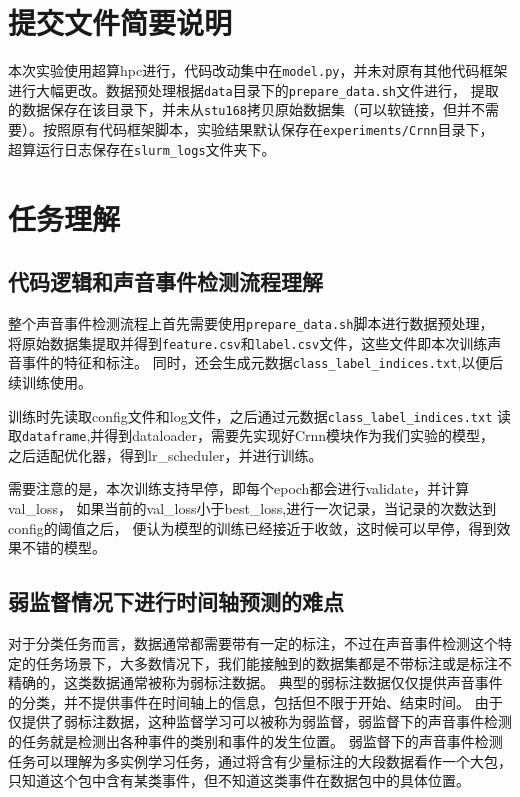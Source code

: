 \documentclass[]{ctexart}
\begin{document}
\section{提交文件简要说明}
本次实验使用超算hpc进行，代码改动集中在\texttt{model.py}，并未对原有其他代码框架进行大幅更改。数据预处理根据\texttt{data}目录下的\texttt{prepare\_data.sh}文件进行，
提取的数据保存在该目录下，并未从\texttt{stu168}拷贝原始数据集（可以软链接，但并不需要）。按照原有代码框架脚本，实验结果默认保存在\texttt{experiments/Crnn}目录下，
超算运行日志保存在\texttt{slurm\_logs}文件夹下。
\section{任务理解}

\subsection{代码逻辑和声音事件检测流程理解}
整个声音事件检测流程上首先需要使用\texttt{prepare\_data.sh}脚本进行数据预处理，
将原始数据集提取并得到\texttt{feature.csv}和\texttt{label.csv}文件，这些文件即本次训练声音事件的特征和标注。
同时，还会生成元数据\texttt{class\_label\_indices.txt},以便后续训练使用。

训练时先读取config文件和log文件，之后通过元数据\texttt{class\_label\_indices.txt}
读取\texttt{dataframe},并得到dataloader，需要先实现好Crnn模块作为我们实验的模型，
之后适配优化器，得到lr\_scheduler，并进行训练。

需要注意的是，本次训练支持早停，即每个epoch都会进行validate，并计算val\_loss，
如果当前的val\_loss小于best\_loss,进行一次记录，当记录的次数达到config的阈值之后，
便认为模型的训练已经接近于收敛，这时候可以早停，得到效果不错的模型。

\subsection{弱监督情况下进行时间轴预测的难点}
对于分类任务而言，数据通常都需要带有一定的标注，不过在声音事件检测这个特定的任务场景下，大多数情况下，我们能接触到的数据集都是不带标注或是标注不精确的，这类数据通常被称为弱标注数据。
典型的弱标注数据仅仅提供声音事件的分类，并不提供事件在时间轴上的信息，包括但不限于开始、结束时间。
由于仅提供了弱标注数据，这种监督学习可以被称为弱监督，弱监督下的声音事件检测的任务就是检测出各种事件的类别和事件的发生位置。
弱监督下的声音事件检测任务可以理解为多实例学习任务，通过将含有少量标注的大段数据看作一个大包，只知道这个包中含有某类事件，但不知道这类事件在数据包中的具体位置。
\end{document}
